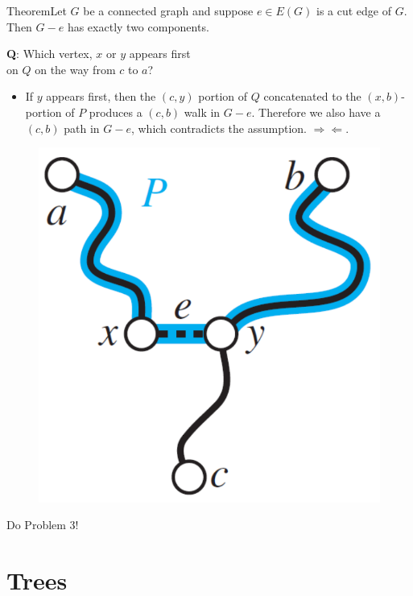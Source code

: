 \documentclass{beamer}
\def\bl[#1]#2{\begin{block}{#1}#2\end{block}}
\def\itemb{\begin{itemize}}
\def\iteme{\end{itemize}}
\begin{document}
\begin{frame}
\bl[Theorem]{Let $G$ be a connected graph and suppose $e\in E(G)$ is a cut edge of $G$. Then $G-e$ has exactly two components.} 
\textbf{Q}: Which vertex, $x$ or $y$ appears first \\ on $Q$ on the way from $c$ to $a$?

\itemb
\item If $y$ appears first, then the $(c,y)$ portion of $Q$ concatenated to the $(x,b)$-portion of $P$ produces a $(c,b)$ walk in $G-e$. Therefore we also have a $(c,b)$ path in $G-e$, which contradicts the assumption. $\Rightarrow\Leftarrow$.
\iteme
\begin{figure}
\centering
\includegraphics[scale=0.25]{Yfirst.pdf}
\end{figure}
\end{frame}

\begin{frame}
\begin{center}
Do Problem 3!
\end{center}
\end{frame}

\section{Trees}
\end{document}
